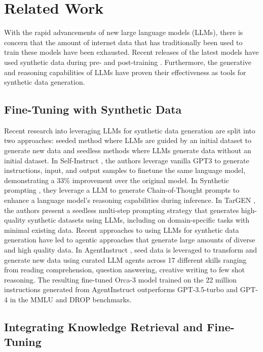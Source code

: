 \section{Related Work}

With the rapid advancements of new large language models (LLMs), there is
concern that the amount of internet data that has traditionally been used to
train these models have been exhausted. Recent releases of the latest models
have used synthetic data during pre- and post-training \citep{abdin_phi-3_2024,
dubey_llama_2024, bai_qwen_2023}. Furthermore, the generative and reasoning
capabilities of LLMs have proven their effectiveness as tools for synthetic data
generation.

\subsection{Fine-Tuning with Synthetic Data}

Recent research into leveraging LLMs for synthetic data generation are split
into two approaches: seeded method where LLMs are guided by an initial dataset
to generate new data and seedless methods where LLMs generate data without an
initial dataset. In Self-Instruct \citep{wang_self-instruct_2023}, the authors
leverage vanilla GPT3 to generate instructions, input, and output samples to
finetune the same language model, demonstrating a 33\% improvement over the
original model. In Synthetic prompting \cite{shao_synthetic_2023}, they leverage
a LLM to generate Chain-of-Thought prompts to enhance a language model’s
reasoning capabilities during inference. In TarGEN \citep{gupta2023targen}, the
authors present a seedless multi-step prompting strategy that generates
high-quality synthetic datasets using LLMs, including on domain-specific tasks
with minimal existing data. Recent approaches to using LLMs for synthetic data
generation have led to agentic approaches that generate large amounts of diverse
and high quality data. In AgentInstruct \citep{mitra_agentinstruct_2024}, seed
data is leveraged to transform and generate new data using curated LLM agents
across 17 different skills ranging from reading comprehension, question
answering, creative writing to few shot reasoning. The resulting fine-tuned
Orca-3 model trained on the 22 million instructions generated from AgentInstruct
outperforms GPT-3.5-turbo and GPT-4 in the MMLU and DROP benchmarks.

\subsection{Integrating Knowledge Retrieval and Fine-Tuning}

